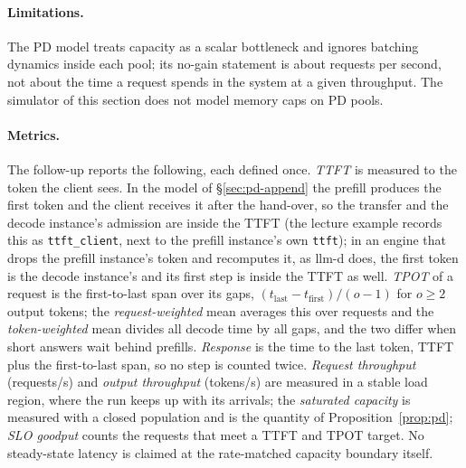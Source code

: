 \paragraph{Limitations.} The PD model treats capacity as a scalar
bottleneck and ignores batching dynamics inside each pool; its no-gain
statement is about requests per second, not about the time a request
spends in the system at a given throughput. The simulator of this
section does not model memory caps on PD pools.

\paragraph{Metrics.} The follow-up reports the following, each defined
once. \emph{TTFT} is measured to the token the client sees. In the model
of \S\ref{sec:pd-append} the prefill produces the first token and the
client receives it after the hand-over, so the transfer and the decode
instance's admission are inside the TTFT (the lecture example records
this as \texttt{ttft\_client}, next to the prefill instance's own
\texttt{ttft}); in an engine that drops the prefill instance's token and
recomputes it, as llm-d does, the first token is the decode instance's
and its first step is inside the TTFT as well. \emph{TPOT} of a request
is the first-to-last span over its gaps,
$(t_{\mathrm{last}}-t_{\mathrm{first}})/(o-1)$ for $o\ge2$ output
tokens; the \emph{request-weighted} mean averages this over requests and
the \emph{token-weighted} mean divides all decode time by all gaps, and
the two differ when short answers wait behind prefills. \emph{Response}
is the time to the last token, TTFT plus the first-to-last span, so no
step is counted twice. \emph{Request
throughput} (requests/s) and \emph{output throughput} (tokens/s) are
measured in a stable load region, where the run keeps up with its
arrivals; the \emph{saturated capacity} is measured with a closed
population and is the quantity of Proposition~\ref{prop:pd}; \emph{SLO
goodput} counts the requests that meet a TTFT and TPOT target. No
steady-state latency is claimed at the rate-matched capacity boundary
itself.

